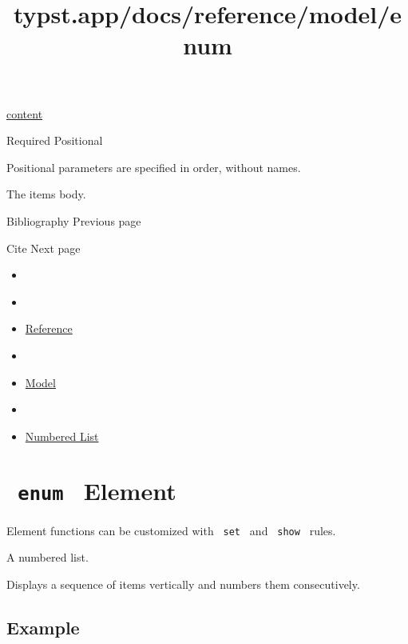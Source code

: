 \href{/docs/reference/foundations/content/}{content}

{Required} {{ Positional }}

\label{definitions-item-body-positional-tooltip}
Positional parameters are specified in order, without names.

The item\textquotesingle s body.

\href{/docs/reference/model/bibliography/}{\pandocbounded{}}

{ Bibliography } { Previous page }

\href{/docs/reference/model/cite/}{\pandocbounded{}}

{ Cite } { Next page }


\title{typst.app/docs/reference/model/enum}

\begin{itemize}
\tightlist
\item
  \href{/docs}{}
\item
  
\item
  \href{/docs/reference/}{Reference}
\item
  
\item
  \href{/docs/reference/model/}{Model}
\item
  
\item
  \href{/docs/reference/model/enum/}{Numbered List}
\end{itemize}

\section{\texorpdfstring{\texttt{\ enum\ } {{ Element
}}}{ enum   Element }}\label{summary}

\label{element-tooltip}
Element functions can be customized with \texttt{\ set\ } and
\texttt{\ show\ } rules.

A numbered list.

Displays a sequence of items vertically and numbers them consecutively.

\subsection{Example}\label{example}

